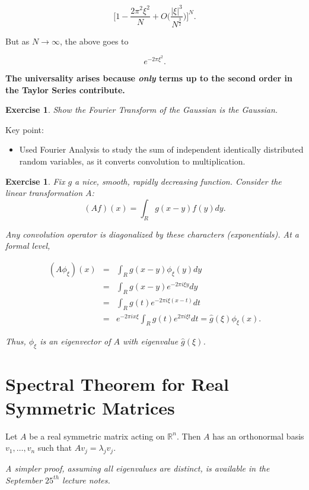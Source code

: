 \documentclass[12pt,letterpaper]{report}
\newcommand\be{\begin{equation}}
\newcommand\ee{\end{equation}}
\newcommand\bea{\begin{eqnarray}}
\newcommand\eea{\end{eqnarray}}
\newcommand{\R}{\ensuremath{\mathbb{R}}}
\newtheorem{exe}[thm]{Exercise}
\begin{document}
\be \Bigg[1 - \frac{2\pi^2 \xi^2}{N} +
O\Bigg(\frac{|\xi|^3}{N^{\frac{3}{2}}}\Bigg) \Bigg]^N. \ee

But as $N \rightarrow \infty$, the above goes to

\be e^{-2\pi \xi^2}. \ee

\textbf{The universality arises because \emph{only} terms up to
the second order in the Taylor Series contribute.}

\begin{exe} Show the Fourier Transform of the Gaussian is the
Gaussian. \end{exe}

Key point:

\begin{itemize}

\item Used Fourier Analysis to study the sum of independent identically
distributed random variables, as it converts convolution to
multiplication.

\end{itemize}


\begin{exe} Fix $g$ a nice, smooth, rapidly decreasing function. Consider the
linear transformation $A$: \be (Af)(x) = \int_R g(x-y)f(y)dy. \ee

Any convolution operator is diagonalized by these characters
(exponentials). At a formal level,

\bea (A\phi_\xi)(x) &=& \int_R g(x-y)\phi_\xi(y)dy \nonumber\\ &=&
\int_R g(x-y)e^{-2\pi i \xi y} dy \nonumber\\ &=& \int_R g(t)
e^{-2\pi i \xi(x-t)}dt \nonumber\\ &=& e^{-2\pi i x \xi} \int_R
g(t) e^{2\pi i \xi t}dt = \hat{g}(\xi) \phi_\xi(x). \eea

Thus, $\phi_\xi$ is an eigenvector of $A$ with eigenvalue
$\hat{g}(\xi)$.

\end{exe}


\section{Spectral Theorem for Real Symmetric Matrices}

Let $A$ be a real symmetric matrix acting on $\R^n$. Then $A$ has
an orthonormal basis $v_1, \dots, v_n$ such that $Av_j = \lambda_j
v_j$.

\emph{A simpler proof, assuming all eigenvalues are distinct, is
available in the September $25^{th}$ lecture notes.}
\end{document}
